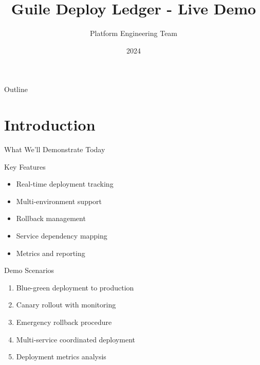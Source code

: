 \documentclass[presentation]{beamer}
\author{Platform Engineering Team}
\date{2024}
\title{Guile Deploy Ledger - Live Demo}
\begin{document}
\maketitle
\begin{frame}{Outline}
\tableofcontents
\end{frame}

\section{Introduction}
\label{sec:org8b8e193}
\begin{frame}[label={sec:orgca3e9de}]{What We'll Demonstrate Today}
\begin{block}{Key Features}
\begin{itemize}
\item Real-time deployment tracking
\item Multi-environment support
\item Rollback management
\item Service dependency mapping
\item Metrics and reporting
\end{itemize}
\end{block}
\begin{block}{Demo Scenarios}
\begin{enumerate}
\item Blue-green deployment to production
\item Canary rollout with monitoring
\item Emergency rollback procedure
\item Multi-service coordinated deployment
\item Deployment metrics analysis
\end{enumerate}
\end{block}
\end{frame}
\end{document}

